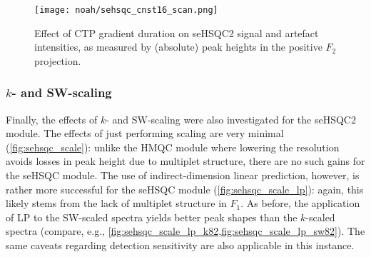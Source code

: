 \begin{figure}[!ht]
    \centering
    \texttt{[image: noah/sehsqc\_cnst16\_scan.png]}%
    \caption[Effect of CTP gradient duration on \nitrogen{} seHSQC2 signal and artefact intensities]{
        Effect of CTP gradient duration on \nitrogen{} seHSQC2 signal and artefact intensities, as measured by (absolute) peak heights in the positive $F_2$ projection.
    }
    \label{fig:sehsqc_cnst16}
\end{figure}


\subsubsection{$k$- and SW-scaling}

Finally, the effects of $k$- and SW-scaling were also investigated for the seHSQC2 module.
The effects of just performing scaling are very minimal (\cref{fig:sehsqc_scale}): unlike the HMQC module where lowering the resolution avoids losses in peak height due to multiplet structure, there are no such gains for the seHSQC module.
The use of indirect-dimension linear prediction, however, is rather more successful for the seHSQC module (\cref{fig:sehsqc_scale_lp}): again, this likely stems from the lack of multiplet structure in $F_1$.
As before, the application of LP to the SW-scaled spectra yields better peak shapes than the $k$-scaled spectra (compare, e.g., \cref{fig:sehsqc_scale_lp_k82,fig:sehsqc_scale_lp_sw82}).
The same caveats regarding detection sensitivity are also applicable in this instance.

